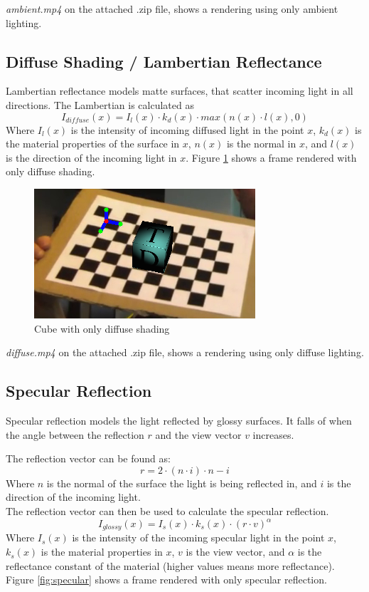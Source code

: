 \documentclass[a4paper,11pt]{article}
\begin{document}
\emph{ambient.mp4} on the attached .zip file, shows a rendering using only ambient lighting.

\subsection{Diffuse Shading / Lambertian Reflectance}
Lambertian reflectance models matte surfaces, that scatter incoming light in all directions.
The Lambertian is calculated as
\[I_{diffuse}(x)=I_l(x) \cdot k_d(x) \cdot max(n(x) \cdot l(x), 0)\]
Where $I_l(x)$ is the intensity of incoming diffused light in the point $x$, $k_d(x)$ is the material properties of the surface in $x$, $n(x)$ is the normal in $x$, and $l(x)$ is the direction of the incoming light in $x$.
Figure \ref{fig:diffuse} shows a frame rendered with only diffuse shading.

\begin{figure}[H]
  \centering
  \includegraphics[width=0.5\linewidth]{only_diffuse}
  \caption{Cube with only diffuse shading}
  \label{fig:diffuse}
\end{figure}

\emph{diffuse.mp4} on the attached .zip file, shows a rendering using only diffuse lighting.


\subsection{Specular Reflection}
Specular reflection models the light reflected by glossy surfaces. It falls of when the angle between the reflection $r$ and the view vector $v$ increases.

The reflection vector can be found as:
\[r=2 \cdot (n \cdot i) \cdot n - i\]
Where $n$ is the normal of the surface the light is being reflected in, and $i$ is the direction of the incoming light.\\

The reflection vector can then be used to calculate the specular reflection.
\[I_{glossy}(x)=I_s(x) \cdot k_s(x) \cdot (r \cdot v)^\alpha\]
Where $I_s(x)$ is the intensity of the incoming specular light in the point $x$, $k_s(x)$ is the material properties in $x$, $v$ is the view vector, and $\alpha$ is the reflectance constant of the material (higher values means more reflectance).
Figure \ref{fig:specular} shows a frame rendered with only specular reflection.
\end{document}
